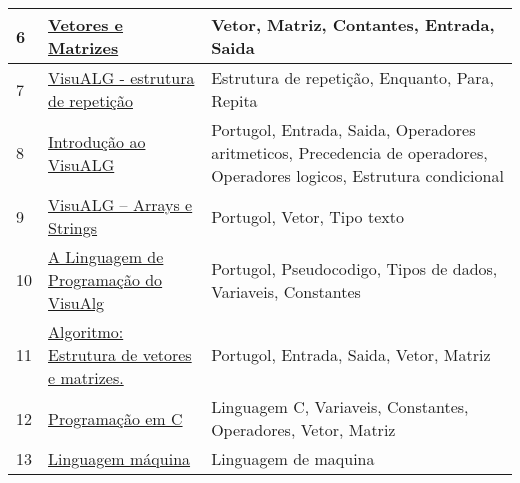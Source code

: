 \begin{longtable}{| p{} | p{} | p{} |}
6   & \href{http://dcm.ffclrp.usp.br/~augusto/teaching/ici/Vetores-Matrizes.pdf}{Vetores e Matrizes                                                                  } & Vetor, Matriz, Contantes, Entrada, Saida                                                                                                          \\ \hline
7   & \href{http://download2.nust.na/pub4/sourceforge/v/vi/visualg30/IP\_03\_VisuALG\_Repeticao.pdf}{VisuALG - estrutura de repetição                                                    } & Estrutura de repetição, Enquanto, Para, Repita                                                                                                    \\ \hline
8   & \href{http://download2.nust.na/pub4/sourceforge/v/vi/visualg30/IP\_02\_VisuALG\_Basico.pdf}{Introdução ao VisuALG                                                               } & Portugol, Entrada, Saida, Operadores aritmeticos, Precedencia de operadores, Operadores logicos, Estrutura condicional                            \\ \hline
9   & \href{http://download2.nust.na/pub4/sourceforge/v/vi/visualg30/IP\_04\_VisuALG\_Arrays.pdf}{VisuALG – Arrays e Strings                                                          } & Portugol, Vetor, Tipo texto                                                                                                                       \\ \hline
10  & \href{http://eletrica.ufpr.br/~rogerio/visualg/Help/linguagem.htm}{A Linguagem de Programação do VisuAlg                                               } & Portugol, Pseudocodigo, Tipos de dados, Variaveis, Constantes                                                                                     \\ \hline
11  & \href{http://fabrica.ms.senac.br/2013/06/algoritmo-estrutura-de-vetores-e-matrizes/}{Algoritmo: Estrutura de vetores e matrizes.                                         } & Portugol, Entrada, Saida, Vetor, Matriz                                                                                                           \\ \hline
12  & \href{http://fig.if.usp.br/~esdobay/c/c.pdf}{Programação em C                                                                    } & Linguagem C, Variaveis, Constantes, Operadores, Vetor, Matriz                                                                                     \\ \hline
13  & \href{http://knoow.net/ciencinformtelec/informatica/linguagem-maquina/}{Linguagem máquina                                                                   } & Linguagem de maquina                                                                                                                              \\ \hline

\end{longtable}
